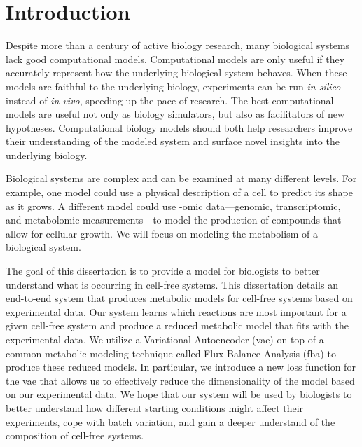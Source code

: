 \chapter{Introduction}
\setcounter{page}{1} 

Despite more than a century of active biology research, many biological systems lack good computational models.
Computational models are only useful if they accurately represent how the underlying biological system behaves.
When these models are faithful to the underlying biology, experiments can be run \textit{in silico} instead of \textit{in vivo}, speeding up the pace of research.
The best computational models are useful not only as biology simulators, but also as facilitators of new hypotheses.
Computational biology models should both help researchers improve their understanding of the modeled system and surface novel insights into the underlying biology.

Biological systems are complex and can be examined at many different levels.
For example, one model could use a physical description of a cell to predict its shape as it grows.
A different model could use -omic data---genomic, transcriptomic, and metabolomic measurements---to model the production of compounds that allow for cellular growth.
We will focus on modeling the metabolism of a biological system.

The goal of this dissertation is to provide a model for biologists to better understand what is occurring in cell-free systems.
This dissertation details an end-to-end system that produces metabolic models for cell-free systems based on experimental data.
Our system learns which reactions are most important for a given cell-free system and produce a reduced metabolic model that fits with the experimental data.
We utilize a Variational Autoencoder (\gls{vae}) on top of a common metabolic modeling technique called Flux Balance Analysis (\gls{fba}) to produce these reduced models.
In particular, we introduce a new loss function for the \gls{vae} that allows us to effectively reduce the dimensionality of the model based on our experimental data.
We hope that our system will be used by biologists to better understand how different starting conditions might affect their experiments, cope with batch variation, and gain a deeper understand of the composition of cell-free systems.


